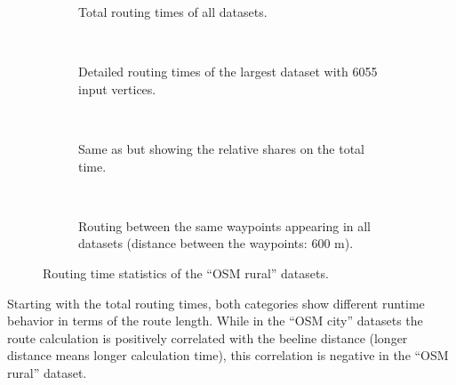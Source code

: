 			\clearpage
			\begin{figure}[h!]
				\begin{figcenter}
					\begin{subfigure}[t]{\textwidth}
						\begin{figcenter}
							
						\end{figcenter}
						\caption{Total routing times of all datasets.}
					\end{subfigure}
					\\[3ex]
					\begin{subfigure}[t]{\textwidth}
						\begin{figcenter}
							
						\end{figcenter}
						\caption{Detailed routing times of the largest dataset with 6055 input vertices.}
						\label{fig:eval-rural-routing-details-b}
					\end{subfigure}
					\\[3ex]
					\begin{subfigure}[t]{\textwidth}
						\begin{figcenter}
							
						\end{figcenter}
						\caption{Same as  but showing the relative shares on the total time.}
					\end{subfigure}
					\\[3ex]
					\begin{subfigure}[t]{\textwidth}
						\begin{figcenter}
							
						\end{figcenter}
						\caption{Routing between the same waypoints appearing in all datasets (distance between the waypoints: 600 m).}
					\end{subfigure}
				\end{figcenter}
				\caption{Routing time statistics of the \enquote{OSM rural} datasets.}
				\label{fig:eval-rural-routing-details}
			\end{figure}
			
			Starting with the total routing times, both categories show different runtime behavior in terms of the route length.
			While in the \enquote{OSM city} datasets the route calculation is positively correlated with the beeline distance (longer distance means longer calculation time), this correlation is negative in the \enquote{OSM rural} dataset.
			
